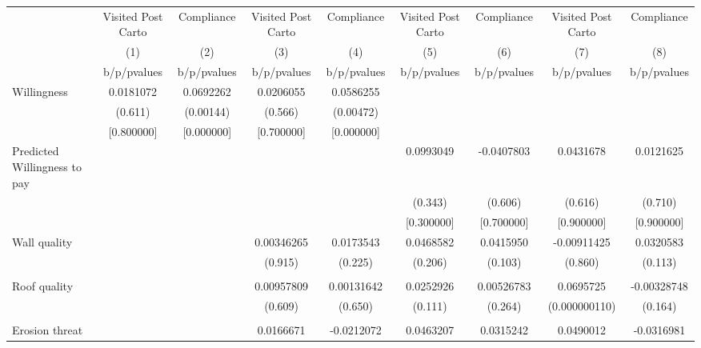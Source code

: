 {
\def\sym#1{\ifmmode^{#1}\else\(^{#1}\)\fi}
\begin{tabular}{l*{8}{c}}
\toprule
                &\multicolumn{1}{c}{Visited Post Carto}&\multicolumn{1}{c}{Compliance}&\multicolumn{1}{c}{Visited Post Carto}&\multicolumn{1}{c}{Compliance}&\multicolumn{1}{c}{Visited Post Carto}&\multicolumn{1}{c}{Compliance}&\multicolumn{1}{c}{Visited Post Carto}&\multicolumn{1}{c}{Compliance}\\
                &\multicolumn{1}{c}{(1)}&\multicolumn{1}{c}{(2)}&\multicolumn{1}{c}{(3)}&\multicolumn{1}{c}{(4)}&\multicolumn{1}{c}{(5)}&\multicolumn{1}{c}{(6)}&\multicolumn{1}{c}{(7)}&\multicolumn{1}{c}{(8)}\\
                &b/p/pvalues&b/p/pvalues&b/p/pvalues&b/p/pvalues&b/p/pvalues&b/p/pvalues&b/p/pvalues&b/p/pvalues\\
\midrule
Willingness     &0.0181072&0.0692262&0.0206055&0.0586255&         &         &         &         \\
                &  (0.611)&(0.00144)&  (0.566)&(0.00472)&         &         &         &         \\
                &[0.800000]&[0.000000]&[0.700000]&[0.000000]&         &         &         &         \\
Predicted Willingness to pay&         &         &         &         &0.0993049&-0.0407803&0.0431678&0.0121625\\
                &         &         &         &         &  (0.343)&  (0.606)&  (0.616)&  (0.710)\\
                &         &         &         &         &[0.300000]&[0.700000]&[0.900000]&[0.900000]\\
Wall quality    &         &         &0.00346265&0.0173543&0.0468582&0.0415950&-0.00911425&0.0320583\\
                &         &         &  (0.915)&  (0.225)&  (0.206)&  (0.103)&  (0.860)&  (0.113)\\
                &         &         &         &         &         &         &         &         \\
Roof quality    &         &         &0.00957809&0.00131642&0.0252926&0.00526783&0.0695725&-0.00328748\\
                &         &         &  (0.609)&  (0.650)&  (0.111)&  (0.264)&(0.000000110)&  (0.164)\\
                &         &         &         &         &         &         &         &         \\
Erosion threat  &         &         &0.0166671&-0.0212072&0.0463207&0.0315242&0.0490012&-0.0316981\\

\end{tabular}}
